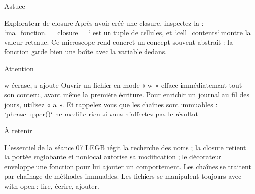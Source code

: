 \documentclass[aspectratio=169,11pt]{beamer}
\begin{document}
\begin{frame}{Astuce}
\begin{exampleblock}{Explorateur de closure}
Après avoir créé une closure, inspectez la : `ma\_fonction.\_\_closure\_\_` est un tuple de cellules, et `.cell\_contents` montre la valeur retenue. Ce microscope rend concret un concept souvent abstrait : la fonction garde bien une boîte avec la variable dedans.
\end{exampleblock}
\end{frame}

\begin{frame}{Attention}
\begin{alertblock}{w écrase, a ajoute}
Ouvrir un fichier en mode « w » efface immédiatement tout son contenu, avant même la première écriture. Pour enrichir un journal au fil des jours, utilisez « a ». Et rappelez vous que les chaînes sont immuables : `phrase.upper()` ne modifie rien si vous n'affectez pas le résultat.
\end{alertblock}
\end{frame}

\begin{frame}{À retenir}
\begin{block}{L'essentiel de la séance 07}
LEGB régit la recherche des noms ; la closure retient la portée englobante et nonlocal autorise sa modification ; le décorateur enveloppe une fonction pour lui ajouter un comportement. Les chaînes se traitent par chaînage de méthodes immuables. Les fichiers se manipulent toujours avec with open : lire, écrire, ajouter.
\end{block}
\end{frame}
\end{document}
